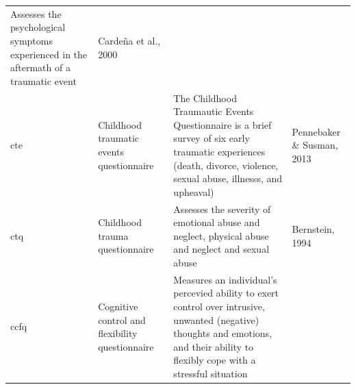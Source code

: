 \documentclass[]{book}
\begin{document}
\begin{longtable}[]{@{}llll@{}}
\begin{minipage}[t]{0.22\columnwidth}
Assesses the psychological symptoms experienced in the aftermath of a traumatic event\strut
\end{minipage} & \begin{minipage}[t]{0.18\columnwidth}\raggedright
Cardeña et al., 2000\strut
\end{minipage}\tabularnewline
\begin{minipage}[t]{0.22\columnwidth}\raggedright
cte\strut
\end{minipage} & \begin{minipage}[t]{0.27\columnwidth}\raggedright
Childhood traumatic events questionnaire\strut
\end{minipage} & \begin{minipage}[t]{0.22\columnwidth}\raggedright
The Childhood Traumautic Events Questionnaire is a brief survey of six early traumatic experiences (death, divorce, violence, sexual abuse, illnesss, and upheaval)\strut
\end{minipage} & \begin{minipage}[t]{0.18\columnwidth}\raggedright
Pennebaker \& Susman, 2013\strut
\end{minipage}\tabularnewline
\begin{minipage}[t]{0.22\columnwidth}\raggedright
ctq\strut
\end{minipage} & \begin{minipage}[t]{0.27\columnwidth}\raggedright
Childhood trauma questionnaire\strut
\end{minipage} & \begin{minipage}[t]{0.22\columnwidth}\raggedright
Assesses the severity of emotional abuse and neglect, physical abuse and neglect and sexual abuse\strut
\end{minipage} & \begin{minipage}[t]{0.18\columnwidth}\raggedright
Bernstein, 1994\strut
\end{minipage}\tabularnewline
\begin{minipage}[t]{0.22\columnwidth}\raggedright
ccfq\strut
\end{minipage} & \begin{minipage}[t]{0.27\columnwidth}\raggedright
Cognitive control and flexibility questionnaire\strut
\end{minipage} & \begin{minipage}[t]{0.22\columnwidth}\raggedright
Measures an individual's percevied ability to exert control over intrusive, unwanted (negative) thoughts and emotions, and their ability to flexibly cope with a stressful situation\strut

\end{minipage}
\end{longtable}
\end{document}
